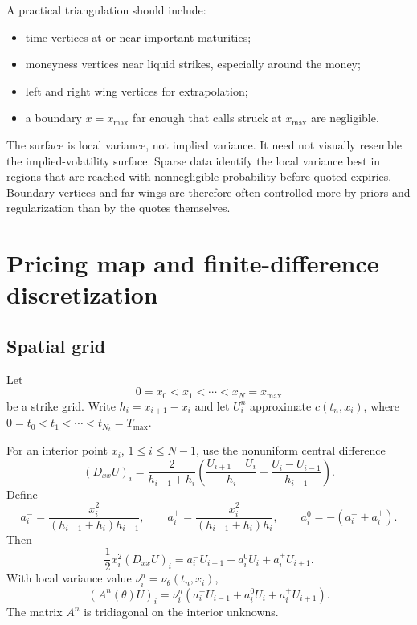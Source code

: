 \documentclass[11pt]{article}
\newcommand{\1}{\mathbf{1}}
\newcommand{\vloc}{\nu}
\newcommand{\Tmax}{T_{\max}}
\newcommand{\xmax}{x_{\max}}
\begin{document}
A practical triangulation should include:

\begin{itemize}[leftmargin=1.1cm]
\item time vertices at or near important maturities;
\item moneyness vertices near liquid strikes, especially around the money;
\item left and right wing vertices for extrapolation;
\item a boundary $x=\xmax$ far enough that calls struck at $\xmax$ are negligible.
\end{itemize}

The surface is local variance, not implied variance. It need not visually resemble the
implied-volatility surface. Sparse data identify the local variance best in regions that
are reached with nonnegligible probability before quoted expiries. Boundary vertices and
far wings are therefore often controlled more by priors and regularization than by the
quotes themselves.

\section{Pricing map and finite-difference discretization}

\subsection{Spatial grid}

Let
\[
  0=x_0<x_1<\cdots<x_N=\xmax
\]
be a strike grid. Write $h_i=x_{i+1}-x_i$ and let $U_i^n$ approximate
$c(t_n,x_i)$, where $0=t_0<t_1<\cdots<t_{N_t}=\Tmax$.

For an interior point $x_i$, $1\le i\le N-1$, use the nonuniform central difference
\begin{equation}
  (D_{xx}U)_i
  =
  \frac{2}{h_{i-1}+h_i}
  \left(
    \frac{U_{i+1}-U_i}{h_i}
    -
    \frac{U_i-U_{i-1}}{h_{i-1}}
  \right).
  \label{eq:nonuniform_second_derivative}
\end{equation}
Define
\[
  a_i^-=\frac{x_i^2}{(h_{i-1}+h_i)h_{i-1}},
  \qquad
  a_i^+=\frac{x_i^2}{(h_{i-1}+h_i)h_i},
  \qquad
  a_i^0=-(a_i^-+a_i^+).
\]
Then
\[
  \frac12 x_i^2(D_{xx}U)_i
  =
  a_i^-U_{i-1}+a_i^0U_i+a_i^+U_{i+1}.
\]
With local variance value $\vloc_i^n=\vloc_\theta(t_n,x_i)$,
\[
  (A^n(\theta)U)_i
  =
  \vloc_i^n\left(a_i^-U_{i-1}+a_i^0U_i+a_i^+U_{i+1}\right).
\]
The matrix $A^n$ is tridiagonal on the interior unknowns.
\end{document}
